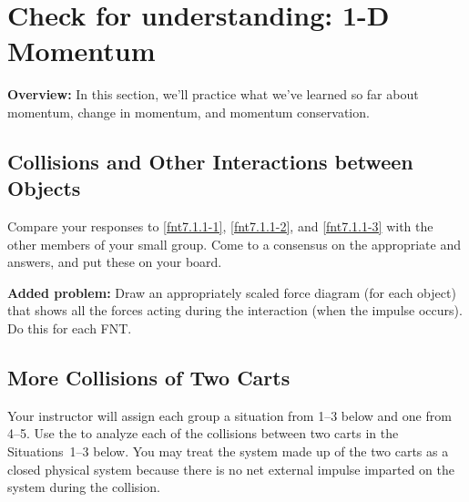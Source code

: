 \section{Check for understanding: 1-D Momentum}
\label{14C.1}

\begin{overview}
	\textbf{Overview:} In this section, we'll practice what we've learned so far about momentum, change in momentum, and momentum conservation.	
\end{overview}

\subsection{Collisions and Other Interactions between Objects}

\begin{fnt}
	
\end{fnt}

\begin{fnt}
	
\end{fnt}

\begin{fnt}
	
\end{fnt}

Compare your responses to \ref{fnt7.1.1-1}, \ref{fnt7.1.1-2}, and \ref{fnt7.1.1-3} with the other members of your small group. Come to a consensus on the appropriate \pcharts{} and answers, and put these on your board.

\textbf{Added problem:} Draw an appropriately scaled force diagram (for each object) that shows all the forces acting during the interaction (when the impulse occurs). Do this for each FNT.

\WCD

\subsection{More Collisions of Two Carts}

\noindent Your instructor will assign each group a situation from 1--3 below and one from 4--5. Use the \pConsModel{} to analyze each of the collisions between two carts in the Situations~1--3 below. You may treat the system made up of the two carts as a closed physical system because there is no net external impulse imparted on the system during the collision.\\


